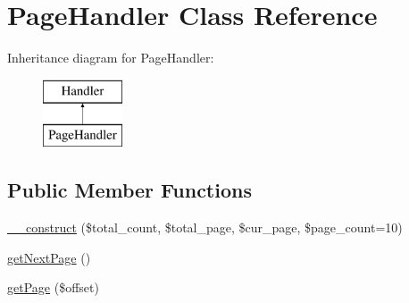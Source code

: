 \hypertarget{classPageHandler}{\section{Page\-Handler Class Reference}
\label{classPageHandler}
}
Inheritance diagram for Page\-Handler\-:\begin{figure}[H]
\begin{center}
\leavevmode
\includegraphics[height=2.000000cm]{classPageHandler}
\end{center}
\end{figure}
\subsection*{Public Member Functions}
\begin{DoxyCompactItemize}
\item 
\hyperlink{classPageHandler_a18d0577484fa9fd40a294a2e099dd29a}{\-\_\-\-\_\-construct} (\$total\-\_\-count, \$total\-\_\-page, \$cur\-\_\-page, \$page\-\_\-count=10)
\item 
\hyperlink{classPageHandler_a259d01838d005d854d4cc263ba524de7}{get\-Next\-Page} ()
\item 
\hyperlink{classPageHandler_a971f178609a0dd6e1a0fd07daa94782d}{get\-Page} (\$offset)
\end{DoxyCompactItemize}
